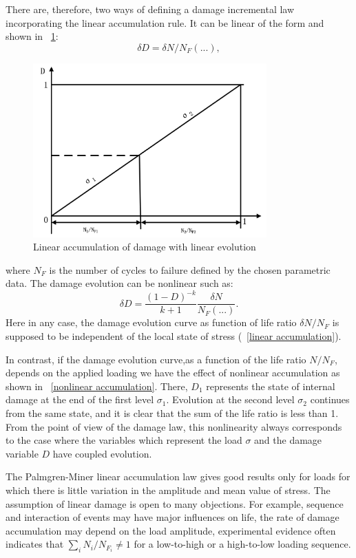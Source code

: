 \documentclass[3p,times,procedia,number]{elsarticle}
\newcommand{\figref}[1]{\figurename~\ref{#1}}
\begin{document}
There are, therefore, two ways of defining a damage incremental law incorporating the linear accumulation rule. It can be linear of the form and shown in \figref{linearevolution}:
$$\delta D= \delta N/N_F(...),$$
\begin{figure}[h!]
	\centering
	\includegraphics[width=0.8\textwidth]{figures//linearevolution.png} 
	\caption{Linear accumulation of damage with linear evolution}
	\label{linearevolution}
\end{figure}
where $N_F$ is the number of cycles to failure defined by the chosen parametric data.
The damage evolution can be nonlinear such as:
$$\delta D= \frac{(1-D)^{-k}}{k+1}\frac{\delta N}{N_F(...)}.$$
Here in any case, the damage evolution curve as function of life ratio $\delta N/N_F$ is supposed to be independent of the local state of stress (\figref{linear accumulation}).

In contrast, if the damage evolution curve,as a function of the life ratio $N/N_F$, depends on the applied loading we have the effect of nonlinear accumulation as shown in \figref{nonlinear accumulation}. There, $D_1$ represents the state of internal damage at the end of the first level $\sigma_1$. Evolution at the second level $\sigma_2$ continues from the same state, and it is clear that the sum of the life ratio is less than 1. From the point of view of the damage law, this nonlinearity always corresponds to the case where the variables which represent the load $\sigma$ and the damage variable $D$ have coupled evolution.

The Palmgren-Miner linear accumulation law gives good results only for loads for which there is little variation in the amplitude and mean value of stress. The assumption of linear damage is open to many objections. For example, sequence and interaction of events may have major influences on life, the rate of damage accumulation may depend on the load amplitude, experimental evidence often indicates that $\sum_{i}N_i/N_{F_i}\neq 1$ for a low-to-high or a high-to-low loading sequence.
\end{document}
